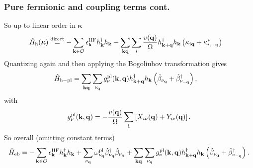 \begin{frame}
    \frametitle{Pure fermionic and coupling terms cont.}
So up to linear order in $\boldsymbol{\kappa}$
\begin{align}
    \hat H_{\rm h}(\boldsymbol{\kappa})
    &\overset{\text{direct}}{=} -
    \sum_{\mathbf k\in\mathcal O}
    \epsilon_{\mathbf k}^{\rm HF}
    h_{\mathbf k}^{\dagger}h_{\mathbf k}
-
    \sum_{\mathbf k\mathbf q}
    \sum_i
    \frac{v(\mathbf q)}{\Omega}
    h_{\mathbf k+\mathbf q}^{\dagger}h_{\mathbf k}
    \left(
        \kappa_{i\mathbf q}
        +
        \kappa_{i,-\mathbf q}^{*}
    \right)
    \label{eq:hole_hamiltonian_linear_kappa}
\end{align} \pause
Quantizing again and then applying the Bogoliubov transformation gives
\begin{align}
    \hat H_{\rm h-pl}
    &=
    \sum_{\mathbf k\mathbf q}
    \sum_{\nu_{\mathbf q}}
    g_{\nu}^{\rm pl}(\mathbf k,\mathbf q)
    h_{\mathbf k+\mathbf q}^{\dagger}
    h_{\mathbf k}
    \left(
        \hat\beta_{\nu_{\mathbf q}}
        +
        \hat\beta_{\nu_{-\mathbf q}}^{\dagger}
    \right),
    \label{eq:hole_plasmon_coupling}
\end{align} \pause
with
\begin{equation}
    {
    g_{\nu}^{\rm pl}(\mathbf k,\mathbf q)
    =
    -\frac{v(\mathbf q)}{\Omega}
    \sum_{\mathbf i}
    \left[
        X_{i\nu}(\mathbf q)
        +
        Y_{i\nu}(\mathbf q)
    \right].
    }
    \label{eq:screened_hole_plasmon_coupling}
\end{equation}\pause
So overall (omitting constant terms)
\begin{equation}
    \hat H_{\rm eb}
    =
    -\sum_{\mathbf k\in\mathcal O}
    \epsilon_{\mathbf k}^{\rm HF}
    h_{\mathbf k}^{\dagger}h_{\mathbf k}
    +
    \sum_{\nu_{\mathbf q}}
    \omega_{\nu_{\mathbf q}}^{\rm pl}
    \hat\beta_{\nu_{\mathbf q}}^{\dagger}
    \hat\beta_{\nu_{\mathbf q}}
    +
    \sum_{\mathbf k\mathbf q}
    \sum_{\nu_{\mathbf q}}
    g_{\nu}^{\rm pl}(\mathbf k,\mathbf q)
    h_{\mathbf k+\mathbf q}^{\dagger}
    h_{\mathbf k}
    \left(
        \hat\beta_{\nu_{\mathbf q}}
        +
        \hat\beta_{\nu_{-\mathbf q}}^{\dagger}
    \right).
\end{equation}


\end{frame}
